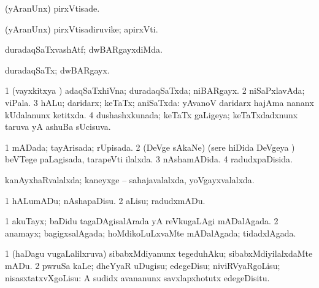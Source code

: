 \bentry
{} 
\gl{\kirxvi}
\expl{}
\bmng
(yAranUnx) pirxVtisade. 
\emng
\eentry

\bentry
{} 
\gl{\nA}
\expl{}
\bmng
(yAranUnx) pirxVtisadiruvike; apirxVti. 
\emng
\eentry

\bentry
{} 
\gl{\kirxvi}
\expl{}
\bmng
duradaqSaTxvashAtf; dwBARgayxdiMda. 
\emng
\eentry

\bentry
{} 
\gl{\nA}
\expl{}
\bmng
duradaqSaTx; dwBARgayx. 
\emng
\eentry

\bentry
{} 
\gl{\gu}
\bmng
\bnum
\num{1} (vayxkitxya \vi) adaqSaTxhiVna; duradaqSaTxda; niBARgayx. 
\num{2} niSaPxlavAda; viPala. 
\num{3} hALu; daridarx; keTaTx; aniSaTxda:  yAvanoV daridarx hajAma nananx kUdalanunx ketitxda. 
\num{4} dushashxkunada; keTaTx gaLigeya; keTaTxdadxnunx taruva yA ashuBa sUcisuva. 
\enum
\emng
\eentry

\bentry
{} 
\gl{\gu}
\bmng
\bnum
\num{1} mADada; tayArisada; rUpisada. 
\num{2} (DeVge sAkaNe) (sere hiDida DeVgeya \vi) beVTege paLagisada, tarapeVti ilalxda. 
\num{3} nAshamADida. 
\num{4} radudxpaDisida. 
\enum
\emng
\eentry

\bentry
{} 
\gl{\gu}
\expl{}
\bmng
kanAyxhaRvalalxda; kaneyxge -- sahajavalalxda, yoVgayxvalalxda. 
\emng
\eentry

\bentry
{} 
\gl{\akirx}
\bmng
\bnum
\num{1} hALumADu; nAshapaDisu. 
\num{2} aLisu; radudxmADu. 
\enum
\emng
\eentry

\bentry
{} 
\gl{\gu}
\expl{}
\bmng
\bnum
\num{1} akuTayx; baDidu tagaDAgisalArada yA reVkugaLAgi mADalAgada. 
\num{2} anamayx; bagigxsalAgada; hoMdikoLuLxvaMte mADalAgada; tidadxlAgada. 
\enum
\emng
\eentry

\bentry
{} 
\gl{\akirx}
\bmng
\bnum
\num{1} (haDagu \mo vugaLalilxruva) sibabxMdiyanunx tegeduhAku; sibabxMdiyilalxdaMte mADu. 
\num{2} pwruSa kaLe; dheYyaR uDugisu; edegeDisu; niviRVyaRgoLisu; nisasxtatxvXgoLisu:  A sudidx avananunx savxlapxhotutx edegeDisitu. 
\enum
\emng
\eentry


